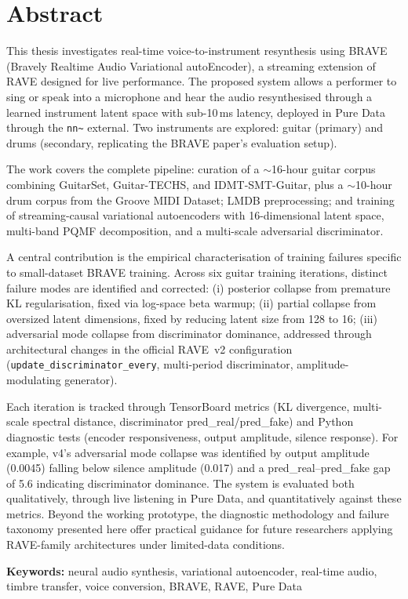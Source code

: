 \chapter*{Abstract}

This thesis investigates real-time voice-to-instrument resynthesis using BRAVE (Bravely Realtime Audio Variational autoEncoder), a streaming extension of RAVE designed for live performance. The proposed system allows a performer to sing or speak into a microphone and hear the audio resynthesised through a learned instrument latent space with sub-10\,ms latency, deployed in Pure Data through the \texttt{nn\textasciitilde} external. Two instruments are explored: guitar (primary) and drums (secondary, replicating the BRAVE paper's evaluation setup).

The work covers the complete pipeline: curation of a $\sim$16-hour guitar corpus combining GuitarSet, Guitar-TECHS, and IDMT-SMT-Guitar, plus a $\sim$10-hour drum corpus from the Groove MIDI Dataset; LMDB preprocessing; and training of streaming-causal variational autoencoders with 16-dimensional latent space, multi-band PQMF decomposition, and a multi-scale adversarial discriminator.

A central contribution is the empirical characterisation of training failures specific to small-dataset BRAVE training. Across six guitar training iterations, distinct failure modes are identified and corrected: (i) posterior collapse from premature KL regularisation, fixed via log-space beta warmup; (ii) partial collapse from oversized latent dimensions, fixed by reducing latent size from 128 to 16; (iii) adversarial mode collapse from discriminator dominance, addressed through architectural changes in the official RAVE~v2 configuration (\texttt{update\_discriminator\_every}, multi-period discriminator, amplitude-modulating generator).

Each iteration is tracked through TensorBoard metrics (KL divergence, multi-scale spectral distance, discriminator pred\_real/pred\_fake) and Python diagnostic tests (encoder responsiveness, output amplitude, silence response). For example, v4's adversarial mode collapse was identified by output amplitude (0.0045) falling below silence amplitude (0.017) and a pred\_real–pred\_fake gap of 5.6 indicating discriminator dominance. The system is evaluated both qualitatively, through live listening in Pure Data, and quantitatively against these metrics. Beyond the working prototype, the diagnostic methodology and failure taxonomy presented here offer practical guidance for future researchers applying RAVE-family architectures under limited-data conditions.

\vspace{1cm}
\noindent\textbf{Keywords:} neural audio synthesis, variational autoencoder, real-time audio, timbre transfer, voice conversion, BRAVE, RAVE, Pure Data
\clearpage
